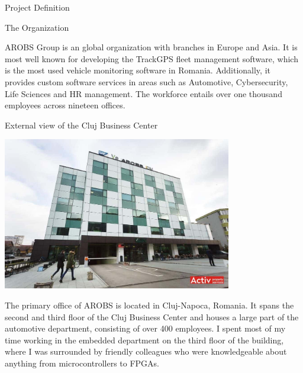 \documentclass{matthijs}
\begin{document}
	\begin{hoofdstuk}{Project Definition}

		\setlength\parindent{1.5em}
		\setlength{\parskip}{0.5em plus 0.2em minus 0.1em}
		\linespread{1.2}

		\begin{paragraaf}{The Organization}

			AROBS Group is an global organization with branches in Europe and Asia.
			It is most well known for developing the TrackGPS fleet management software, which is the most used vehicle monitoring software in Romania.
			Additionally, it provides custom software services in areas such as Automotive, Cybersecurity, Life Sciences and HR management.
			The workforce entails over one thousand employees across nineteen offices.

			\vspace{0.3ex}
			\begin{figuur}{External view of the Cluj Business Center}

				\includegraphics[width=0.75\textwidth, clip, trim=0cm 2cm 0cm 0cm]{cbc.jpg}

			\end{figuur}
			\vspace{-0.2ex}

			\noindent The primary office of AROBS is located in Cluj-Napoca, Romania. 
			It spans the second and third floor of the Cluj Business Center and houses a large part of the automotive department, consisting of over 400 employees.
			I spent most of my time working in the embedded department on the third floor of the building, where I was surrounded by friendly colleagues who were knowledgeable about anything from microcontrollers to FPGAs.
			

\end{paragraaf}
\end{hoofdstuk}
\end{document}
